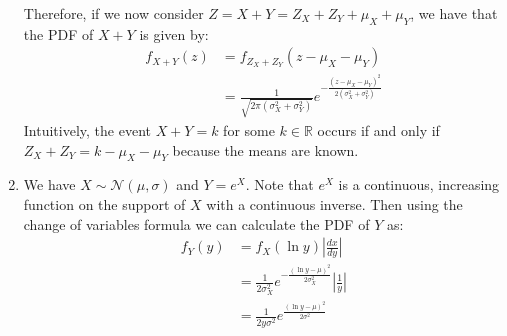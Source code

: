 \documentclass[submit]{harvardml}
\theoremstyle{plain}
\begin{document}
\begin{enumerate}[label=(\alph*)]
Therefore, if we now consider $Z = X+Y = Z_X + Z_Y + \mu_X + \mu_Y$,  we have that the PDF of $X + Y$ is given by:
\begin{align*}
f_{X+Y}(z) &= f_{Z_X + Z_Y}(z - \mu_X - \mu_Y) \\
&= \frac{1}{\sqrt{2\pi(\sigma_X^2 + \sigma_Y^2)}}e^{-\frac{(z-\mu_X-\mu_Y)^2}{2(\sigma_X^2 + \sigma_Y^2)}}
\end{align*}
Intuitively, the event $X + Y = k$ for some $k \in \mathbb{R}$ occurs if and only if $Z_X + Z_Y = k - \mu_X -\mu_Y$ because the means are known.

\item We have $X \sim \mathcal{N}(\mu, \sigma)$ and $Y = e^X$. Note that $e^X$ is a continuous, increasing function on the support of $X$ with a continuous inverse. Then using the change of variables formula we can calculate the PDF of $Y$ as:
\begin{align*}
f_{Y}(y) &= f_X(\ln y) \left|\frac{dx}{dy}\right| \\
&= \frac{1}{2\sigma_X^2}e^{-\frac{(\ln y - \mu)^2}{2\sigma_X^2}} \left|\frac{1}{y} \right| \\
&= \frac{1}{2y\sigma^2}e^{\frac{(\ln y - \mu)^2}{2\sigma^2}} \tag{restrict support to $y > 0$}
\end{align*}
\end{enumerate}
\end{document}
